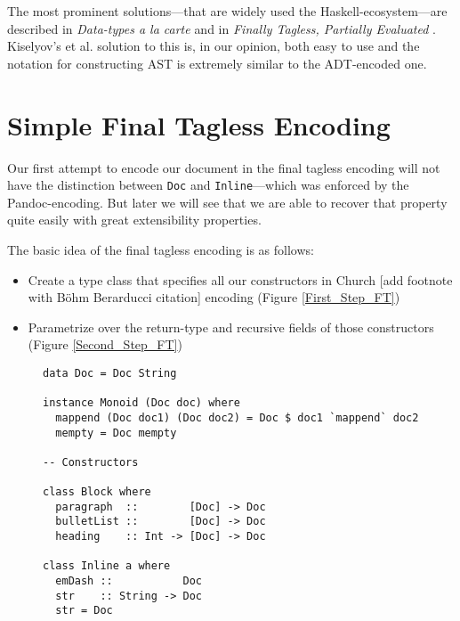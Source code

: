 The most prominent solutions—that are widely used the Haskell-ecosystem—are
described in \emph{Data-types a la carte} \cite{data-types-a-la-carte} and in
\emph{Finally Tagless, Partially Evaluated} \cite{finally-tagless}. Kiselyov’s
et al. solution to this is, in our opinion, both easy to use and the notation
for constructing AST is extremely similar to the ADT-encoded one.


\section{Simple Final Tagless Encoding}
\label{sec:org6195637}

Our first attempt to encode our document in the final tagless encoding will not
have the distinction between \texttt{Doc} and \texttt{Inline}—which was enforced
by the Pandoc-encoding. But later we will see that we are able to recover that
property quite easily with great extensibility properties.

The basic idea of the final tagless encoding is as follows:

\begin{itemize}
\item Create a type class that specifies all our constructors in Church [add
  footnote with Böhm Berarducci citation] encoding (Figure \ref{First_Step_FT})
\item Parametrize over the return-type and recursive fields of those
  constructors (Figure \ref{Second_Step_FT})
\end{itemize}

\begin{figure}
\begin{lstlisting}
data Doc = Doc String

instance Monoid (Doc doc) where
  mappend (Doc doc1) (Doc doc2) = Doc $ doc1 `mappend` doc2
  mempty = Doc mempty

-- Constructors

class Block where
  paragraph  ::        [Doc] -> Doc
  bulletList ::        [Doc] -> Doc
  heading    :: Int -> [Doc] -> Doc

class Inline a where
  emDash ::           Doc
  str    :: String -> Doc
  str = Doc
\end{lstlisting}
\end{figure}

